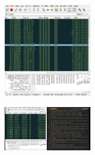 \documentclass{assignment}
\begin{document}
\begin{itemize}
\begin{figure}[h]
\begin{center}
      \end{center}
      \label{fig:}
    \end{figure}
    \newpage
    \begin{figure}[h]
      \begin{center}
        \includegraphics[width=0.35\textwidth]{1008.png}
      \end{center}
      \label{fig:}
    \end{figure}
    \begin{figure}[h]
      \begin{center}
        \includegraphics[width=0.35\textwidth]{1009.png}
      \end{center}
      \label{fig:}
    \end{figure}


\end{itemize}
\end{document}

